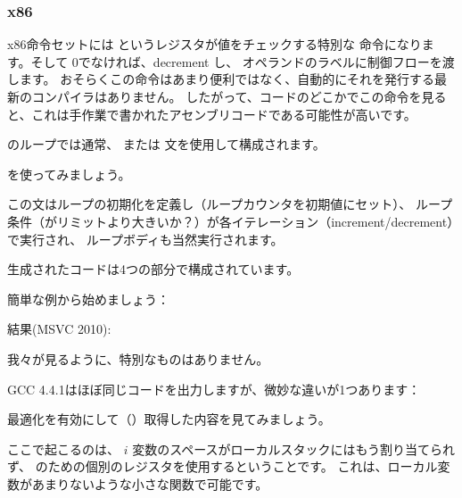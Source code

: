 ﻿\subsubsection{x86}


x86命令セットには \ECX というレジスタが値をチェックする特別な \LOOP 命令になります。そして
0でなければ、\gls{decrement} \ECX し、 \LOOP オペランドのラベルに制御フローを渡します。
おそらくこの命令はあまり便利ではなく、自動的にそれを発行する最新のコンパイラはありません。
したがって、コードのどこかでこの命令を見ると、これは手作業で書かれたアセンブリコードである可能性が高いです。

\par

\CCpp のループでは通常、 または 文を使用して構成されます。

を使ってみましょう。

この文はループの初期化を定義し（ループカウンタを初期値にセット）、
ループ条件（がリミットより大きいか？）が各イテレーション（\gls{increment}/\gls{decrement}）で実行され、
ループボディも当然実行されます。



生成されたコードは4つの部分で構成されています。

簡単な例から始めましょう：



結果(MSVC 2010):



我々が見るように、特別なものはありません。

GCC 4.4.1はほぼ同じコードを出力しますが、微妙な違いが1つあります：



最適化を有効にして（\TT{\Ox}）取得した内容を見てみましょう。



ここで起こるのは、 $i$ 変数のスペースがローカルスタックにはもう割り当てられず、
\ESI のための個別のレジスタを使用するということです。 
これは、ローカル変数があまりないような小さな関数で可能です。

